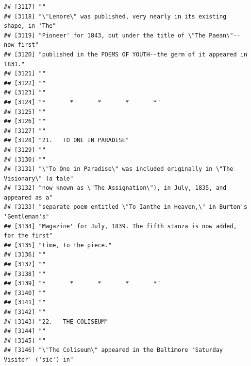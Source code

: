 \documentclass{article}\usepackage[]{graphicx}\usepackage[]{color}
\makeatletter
\newenvironment{kframe}{%
 \def\at@end@of@kframe{}%
 \ifinner\ifhmode%
  \def\at@end@of@kframe{\end{minipage}}%
  \begin{minipage}{\columnwidth}%
 \fi\fi%
 \def\FrameCommand##1{\hskip\@totalleftmargin \hskip-\fboxsep
 \colorbox{shadecolor}{##1}\hskip-\fboxsep
     \hskip-\linewidth \hskip-\@totalleftmargin \hskip\columnwidth}%
 \MakeFramed {\advance\hsize-\width
   \@totalleftmargin\z@ \linewidth\hsize
   \@setminipage}}%
 {\par\unskip\endMakeFramed%
 \at@end@of@kframe}
\newenvironment{knitrout}{}{} %
\makeatother
\begin{document}
\begin{knitrout}
\begin{kframe}
\begin{verbatim}
## [3117] ""                                                                            
## [3118] "\"Lenore\" was published, very nearly in its existing shape, in 'The"        
## [3119] "Pioneer' for 1843, but under the title of \"The Paean\"--now first"          
## [3120] "published in the POEMS OF YOUTH--the germ of it appeared in 1831."           
## [3121] ""                                                                            
## [3122] ""                                                                            
## [3123] ""                                                                            
## [3124] "*       *       *       *       *"                                           
## [3125] ""                                                                            
## [3126] ""                                                                            
## [3127] ""                                                                            
## [3128] "21.   TO ONE IN PARADISE"                                                    
## [3129] ""                                                                            
## [3130] ""                                                                            
## [3131] "\"To One in Paradise\" was included originally in \"The Visionary\" (a tale" 
## [3132] "now known as \"The Assignation\"), in July, 1835, and appeared as a"         
## [3133] "separate poem entitled \"To Ianthe in Heaven,\" in Burton's 'Gentleman's"    
## [3134] "Magazine' for July, 1839. The fifth stanza is now added, for the first"      
## [3135] "time, to the piece."                                                         
## [3136] ""                                                                            
## [3137] ""                                                                            
## [3138] ""                                                                            
## [3139] "*       *       *       *       *"                                           
## [3140] ""                                                                            
## [3141] ""                                                                            
## [3142] ""                                                                            
## [3143] "22.   THE COLISEUM"                                                          
## [3144] ""                                                                            
## [3145] ""                                                                            
## [3146] "\"The Coliseum\" appeared in the Baltimore 'Saturday Visitor' ('sic') in"    

\end{verbatim}
\end{kframe}
\end{knitrout}
\end{document}
